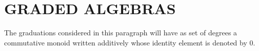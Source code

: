 \section{GRADED ALGEBRAS}

The graduations considered in this paragraph will have as set of degrees a commutative monoid written additively whose identity element is denoted by 0.

